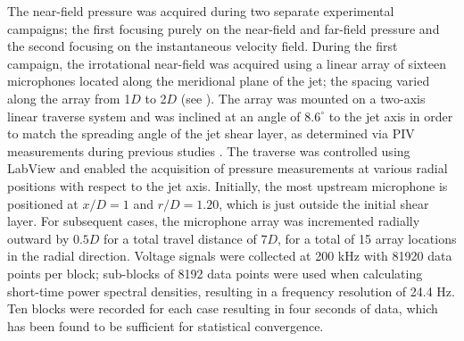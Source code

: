 The near-field pressure was acquired  during two separate experimental campaigns; the first focusing purely on the near-field and far-field pressure and the second focusing on the instantaneous velocity field. During the first campaign, the irrotational near-field was acquired using a linear array of sixteen microphones located along the meridional plane of the jet; the spacing varied along the array from 1$D$ to 2$D$ (see ). 
The array was mounted on a two-axis linear traverse system and was inclined at an angle of $8.6^\circ$ to the jet axis in order to match the spreading angle of the jet shear layer, as determined via PIV measurements during previous studies \citep{Kearney-Fischer2009}. 
The traverse was controlled using LabView and enabled the acquisition of pressure measurements at various radial positions with respect to the jet axis. 
Initially, the most upstream microphone is positioned at $x/D = 1$ and $r/D = 1.20$, which is just outside the initial shear layer.
For subsequent cases, the microphone array was incremented radially outward by $0.5D$ for a total travel distance of $7D$, for a total of 15 array locations in the radial direction.
Voltage signals were collected at 200 kHz with 81920 data points per block; sub-blocks of 8192 data points were used when calculating short-time power spectral densities, resulting in a frequency resolution of 24.4 Hz. 
Ten blocks were recorded for each case resulting in four seconds of data, which has been found to be sufficient for statistical convergence.
